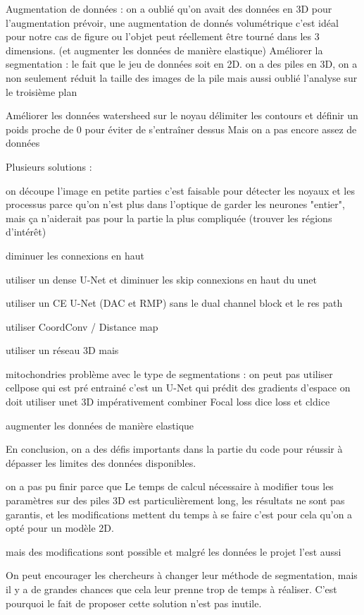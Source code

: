Augmentation de données : 
on a oublié qu'on avait des données en 3D pour l'augmentation 
prévoir,
 une augmentation de donnés volumétrique
c'est idéal pour notre cas de figure ou l'objet peut réellement être tourné dans les 3 dimensions.
(et augmenter les données de manière elastique) 
Améliorer la segmentation : 
le fait que le jeu de données soit en 2D. 
on a des piles en 3D, on a non seulement réduit la taille des images de la pile mais aussi oublié l'analyse sur le troisième plan 


Améliorer les données 
watersheed sur le noyau 
délimiter les contours et définir un poids proche de 0 pour éviter de s'entraîner dessus 
Mais on a pas encore assez de données 

Plusieurs solutions : 

on découpe l'image en petite parties   
c'est faisable pour détecter les noyaux et les processus parce qu'on n'est plus dans l'optique de garder les neurones "entier", mais ça n'aiderait pas pour la partie la plus compliquée (trouver les régions d'intérêt) 

diminuer les connexions en haut 
 
utiliser un dense U-Net et diminuer les skip connexions en haut du unet

utiliser un CE U-Net (DAC et RMP) sans le dual channel block et le res path 

utiliser CoordConv / Distance map 


utiliser un réseau 3D mais 

mitochondries
problème avec le type de segmentations : 
on peut pas 
utiliser cellpose qui est pré entrainé 
c'est un U-Net qui prédit des gradients d'espace 
on doit utiliser unet 3D impérativement 
combiner Focal loss dice loss et cldice 

augmenter les données de manière elastique 



En conclusion, on a des défis importants dans la partie du code pour réussir à dépasser les limites des données disponibles. 

on a pas pu finir parce que
Le temps de calcul nécessaire à modifier tous les paramètres sur des piles 3D est particulièrement long, les résultats ne sont pas garantis, et les modifications mettent du temps à se faire c'est pour cela qu'on a opté pour un modèle 2D. 

mais des modifications sont possible et malgré les données le projet l'est aussi

On peut encourager les chercheurs à changer leur méthode de segmentation, mais il y a de grandes chances que cela leur prenne trop de temps à réaliser. C'est pourquoi le fait de proposer cette solution n'est pas inutile. 

